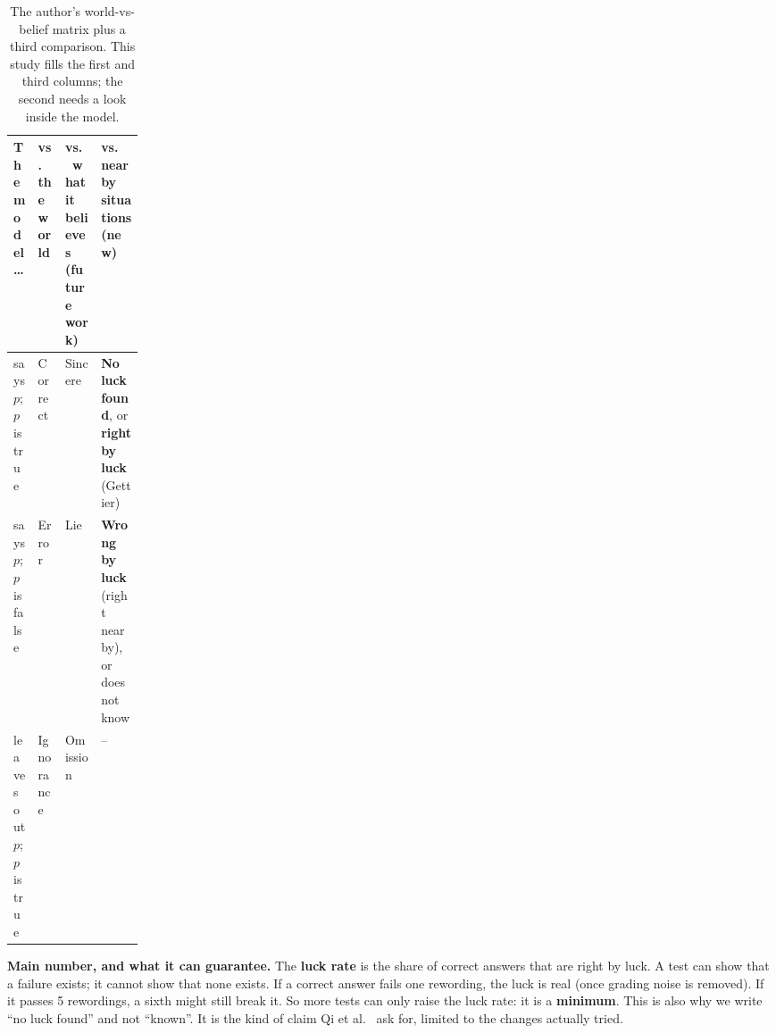\documentclass[10pt]{article}
\begin{document}
\begin{table}[h]
\centering\footnotesize\vspace{-0.4em}
\begin{tabularx}{\linewidth}{@{}p{0.17\linewidth} Y Y Y@{}}
\toprule
The model\ldots & vs.\ the world & vs.\ what it believes (future work) & vs.\ nearby situations (\textbf{new}) \\
\midrule
says $p$; $p$ is true & Correct & Sincere & \textbf{No luck found}, or \textbf{right by luck} (Gettier) \\
says $p$; $p$ is false & Error & Lie & \textbf{Wrong by luck} (right nearby), or does not know \\
leaves out $p$; $p$ is true & Ignorance & Omission & -- \\
\bottomrule
\end{tabularx}
\caption{The author's world-vs-belief matrix plus a third comparison. This study fills the first and third columns; the second needs a look inside the model.}
\label{tab:matrix}\vspace{-1em}
\end{table}

\noindent\textbf{Main number, and what it can guarantee.} The \textbf{luck rate} is the share of correct answers that are right by luck. A test can show that a failure exists; it cannot show that none exists. If a correct answer fails one rewording, the luck is real (once grading noise is removed). If it passes 5 rewordings, a sixth might still break it. So more tests can only raise the luck rate: it is a \textbf{minimum}. This is also why we write ``no luck found'' and not ``known''. It is the kind of claim Qi et al.~\cite{durability} ask for, limited to the changes actually tried.
\end{document}
